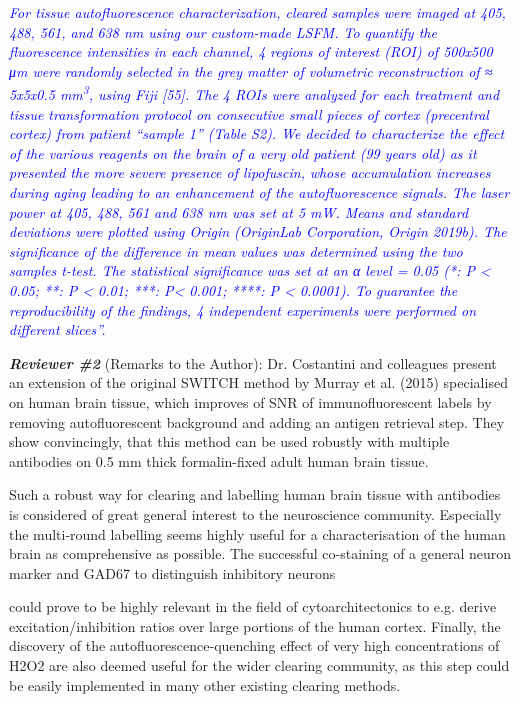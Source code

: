 \documentclass{article}
\newcommand{\reply}[1]{\textcolor{blue}{#1}}
\begin{document}
\noindent \reply{\emph{For tissue autofluorescence characterization, cleared samples were imaged at 405, 488, 561, and}} \reply{\emph{638 nm using our custom-made LSFM. To quantify the fluorescence intensities in each channel, 4}} \reply{\emph{regions of interest (ROI) of 500x500 μm were randomly selected in the grey matter of volumetric}} \reply{\emph{reconstruction of ≈ 5x5x0.5 mm}}\reply{\emph{\textsuperscript{3}}}\reply{\emph{, using Fiji [55]. The 4 ROIs were analyzed for each treatment and}} \reply{\emph{tissue transformation protocol on consecutive small pieces of cortex (precentral cortex) from}} \reply{\emph{patient “sample 1” (Table S2). We decided to characterize the effect of the various reagents on the}} \reply{\emph{brain of a very old patient (99 years old) as it presented the more severe presence of lipofuscin,}} \reply{\emph{whose accumulation increases during aging leading to an enhancement of the autofluorescence}} \reply{\emph{signals. The laser power at 405, 488, 561 and 638 nm was set at 5 mW. Means and standard}} \reply{\emph{deviations were plotted using Origin (OriginLab Corporation, Origin 2019b). The significance of the}} \reply{\emph{difference in mean values was determined using the two samples t-test. The statistical significance}} \reply{\emph{was set at an α level = 0.05 (*: P < 0.05; **: P < 0.01; ***: P< 0.001; ****: P < 0.0001). To guarantee}} \reply{\emph{the reproducibility of the findings, 4 independent experiments were performed on different slices”.}}

\noindent \emph{\textbf{Reviewer \#2}} (Remarks to the Author): Dr. Costantini and colleagues present an extension of the original SWITCH method by Murray et al. (2015) specialised on human brain tissue, which improves of SNR of immunofluorescent labels by removing autofluorescent background and adding an antigen retrieval step. They show convincingly, that this method can be used robustly with multiple antibodies on 0.5 mm thick formalin-fixed adult human brain tissue.

\noindent Such a robust way for clearing and labelling human brain tissue with antibodies is considered of great general interest to the neuroscience community. Especially the multi-round labelling seems highly useful for a characterisation of the human brain as comprehensive as possible. The successful co-staining of a general neuron marker and GAD67 to distinguish inhibitory neurons

\noindent {}could prove to be highly relevant in the field of cytoarchitectonics to e.g. derive excitation/inhibition ratios over large portions of the human cortex. Finally, the discovery of the autofluorescence-quenching effect of very high concentrations of H2O2 are also deemed useful for the wider clearing community, as this step could be easily implemented in many other existing clearing methods.
\end{document}

